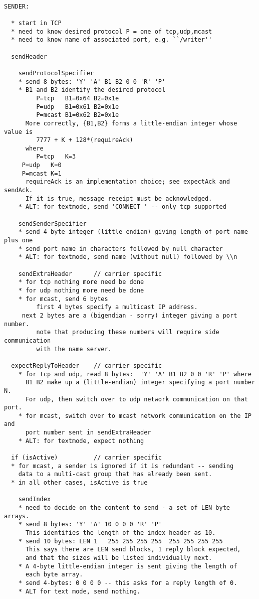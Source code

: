 \begin{verbatim}

SENDER:

  * start in TCP
  * need to know desired protocol P = one of tcp,udp,mcast
  * need to know name of associated port, e.g. ``/writer''

  sendHeader

    sendProtocolSpecifier
    * send 8 bytes: 'Y' 'A' B1 B2 0 0 'R' 'P'
    * B1 and B2 identify the desired protocol
         P=tcp   B1=0x64 B2=0x1e
         P=udp   B1=0x61 B2=0x1e
         P=mcast B1=0x62 B2=0x1e
      More correctly, {B1,B2} forms a little-endian integer whose value is
         7777 + K + 128*(requireAck)
      where 
         P=tcp   K=3
	 P=udp   K=0
	 P=mcast K=1
      requireAck is an implementation choice; see expectAck and sendAck.
      If it is true, message receipt must be acknowledged.
    * ALT: for textmode, send 'CONNECT ' -- only tcp supported

    sendSenderSpecifier
    * send 4 byte integer (little endian) giving length of port name plus one
    * send port name in characters followed by null character
    * ALT: for textmode, send name (without null) followed by \\n

    sendExtraHeader      // carrier specific
    * for tcp nothing more need be done
    * for udp nothing more need be done
    * for mcast, send 6 bytes
         first 4 bytes specify a multicast IP address.
	 next 2 bytes are a (bigendian - sorry) integer giving a port number.
         note that producing these numbers will require side communication
         with the name server.

  expectReplyToHeader    // carrier specific
    * for tcp and udp, read 8 bytes:  'Y' 'A' B1 B2 0 0 'R' 'P' where
      B1 B2 make up a (little-endian) integer specifying a port number N.
      For udp, then switch over to udp network communication on that port.
    * for mcast, switch over to mcast network communication on the IP and
      port number sent in sendExtraHeader
    * ALT: for textmode, expect nothing

  if (isActive)          // carrier specific
  * for mcast, a sender is ignored if it is redundant -- sending
    data to a multi-cast group that has already been sent.
  * in all other cases, isActive is true

    sendIndex
    * need to decide on the content to send - a set of LEN byte arrays.
    * send 8 bytes: 'Y' 'A' 10 0 0 0 'R' 'P'
      This identifies the length of the index header as 10.
    * send 10 bytes: LEN 1   255 255 255 255  255 255 255 255
      This says there are LEN send blocks, 1 reply block expected,
      and that the sizes will be listed individually next.
    * A 4-byte little-endian integer is sent giving the length of
      each byte array.
    * send 4-bytes: 0 0 0 0 -- this asks for a reply length of 0.
    * ALT for text mode, send nothing.


\end{verbatim}
